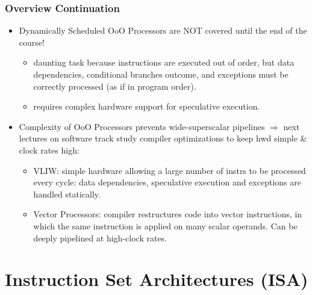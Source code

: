\documentclass{beamer}
\begin{document}
\begin{frame}[fragile,t]
\frametitle{Overview Continuation}

\begin{itemize}
    \item Dynamically Scheduled OoO Processors are NOT covered until the end of the course!
        \begin{itemize}
            \item daunting task because instructions are
                    executed out of order, but data dependencies, conditional branches outcome,
                    and exceptions must be correctly processed (as if in program order).
            \item requires complex hardware support for speculative execution.
        \end  {itemize}\bigskip

    \item Complexity of OoO Processors prevents wide-superscalar
            pipelines $\Rightarrow$ next lectures on software track study
            compiler optimizations to keep hwd simple \& clock rates high:
        \begin{itemize}
            \item VLIW: simple hardware allowing a large number of instrs to be     
                        processed every cycle: data dependencies, speculative execution 
                        and exceptions are handled statically. 
            \item Vector Processors: compiler restructures code into vector instructions,
                    in which the same instruction is applied on many scalar operands.
                    Can be deeply pipelined at high-clock rates. 
        \end  {itemize}\bigskip
\end  {itemize}

\end{frame}

\section{Instruction Set Architectures (ISA)}

\begin{frame}[fragile]
	\tableofcontents[currentsection]
\end{frame}
\end{document}
